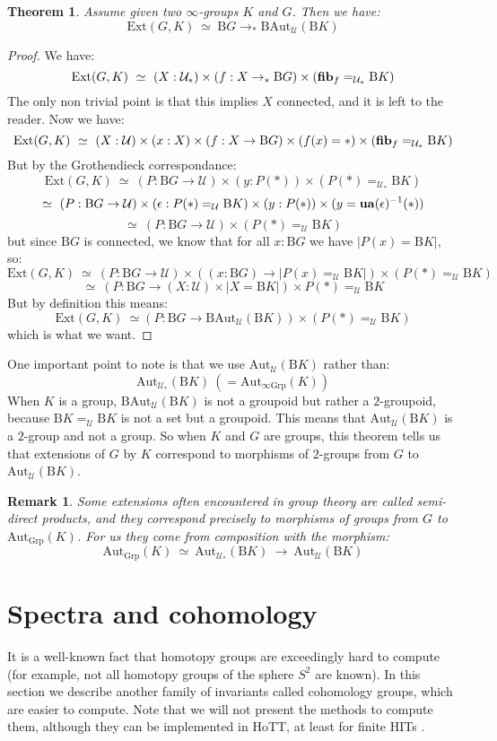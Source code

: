 \documentclass{article}
\newcommand{\se}[1]{\medbreak \medbreak \section{#1}}
\newcommand{\U}{{\mathcal U}}
\renewcommand{\r}{\rightarrow}
\newcommand{\fib}{\mathrm{\bf fib}}
\newcommand{\ua}{\mathrm{\bf ua}}
\newcommand{\Grp}{\mathrm{Grp}}
\newcommand{\B}{\mathrm{B}}
\newcommand{\Aut}{\mathrm{Aut}}
\newtheorem{theorem}{Theorem}
\newtheorem{remark}{Remark}
\begin{document}
\begin{theorem}
Assume given two $\infty$-groups $K$ and $G$. Then we have:
\[\mathrm{Ext}(G,K)\ \simeq \ \B G\r_* \B\Aut_\U(\B K)\]
\end{theorem}
\begin{proof}
We have:
\[\mathrm{Ext}(G,K) \ \simeq\ (X:\U_*) \times (f:X\r_* \B G) \times (\fib_f=_{\U_*} \B K) \]
The only non trivial point is that this implies $X$ connected, and it is left to the reader. Now we have:
\[\mathrm{Ext}(G,K) \ \simeq \ (X:\U)\times (x:X)\times (f:X\r \B G)\times (f(x)=*) \times  (\fib_f=_{\U_*} \B K) \]
But by the Grothendieck correspondance:
\[\mathrm{Ext}(G,K) \ \simeq\ (P : \B G \r \U) \times (y:P(*))\times (P(*) =_{\U_*} \B K) \]
\[\simeq \ (P : \B G \r \U)\times (\epsilon : P(*) =_\U \B K) \times (y:P(*)) \times (y= \ua(\epsilon)^{-1}(*))\]
\[\simeq\ (P:\B G \r \U) \times (P(*) =_\U \B K)\]
but since $\B G$ is connected, we know that for all $x:\B G$ we have $|P(x) = \B K|$, so:
\[\mathrm{Ext}(G,K) \ \simeq\ (P:\B G \r \U)\times ((x:\B G)\r |P(x) =_\U \B K|) \times (P(*) =_\U \B K)\]
\[\simeq\  (P:\B G\r (X:\U)\times | X= \B K|)\times P(*) =_\U \B K\]
But by definition this means:
\[\mathrm{Ext}(G,K) \ \simeq (P:\B G\r \B\Aut_\U(\B K))\times (P(*) =_\U \B K)\]
which is what we want.
\end{proof}

One important point to note is that we use $\Aut_\U(\B K)$ rather than: 
\[\Aut_{\U_*}(\B K)\ (=\Aut_{\infty\Grp}(K))\] 
When $K$ is a group, $\B\Aut_\U(\B K)$ is not a groupoid but rather a $2$-groupoid, because $\B K =_\U\B K$ is not a set but a groupoid. This means that $\Aut_\U(\B K)$ is a $2$-group and not a group. So when $K$ and $G$ are groups, this theorem tells us that extensions of $G$ by $K$ correspond to morphisms of $2$-groups from $G$ to $\Aut_\U(\B K)$.

\begin{remark}
Some extensions often encountered in group theory are called semi-direct products, and they correspond precisely to morphisms of groups from $G$ to $\Aut_\Grp(K)$. For us they come from composition with the morphism:
\[\Aut_\Grp(K) \ \simeq\ \Aut_{\U_*}(\B K) \ \r \ \Aut_\U(\B K)\]
\end{remark}




\se{Spectra and cohomology}

It is a well-known fact that homotopy groups are exceedingly hard to compute (for example, not all homotopy groups of the sphere $S^2$ are known). In this section we describe another family of invariants called cohomology groups, which are easier to compute. Note that we will not present the methods to compute them, although they can be implemented in HoTT, at least for finite HITs \cite{buchholtz2018cellular}.
\end{document}
